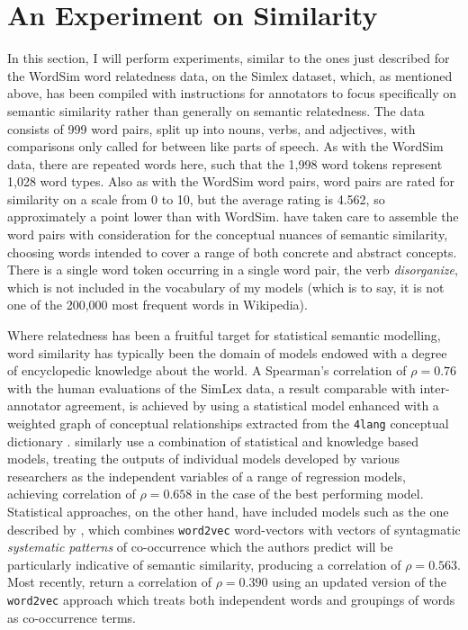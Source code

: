 \section{An Experiment on Similarity}
In this section, I will perform experiments, similar to the ones just described for the WordSim word relatedness data, on the Simlex dataset, which, as mentioned above, has been compiled with instructions for annotators to focus specifically on semantic similarity rather than generally on semantic relatedness.  The data consists of 999 word pairs, split up into nouns, verbs, and adjectives, with comparisons only called for between like parts of speech.  As with the WordSim data, there are repeated words here, such that the 1,998 word tokens represent 1,028 word types.  Also as with the WordSim word pairs, word pairs are rated for similarity on a scale from 0 to 10, but the average rating is 4.562, so approximately a point lower than with WordSim.  \cite{HillEA2015} have taken care to assemble the word pairs with consideration for the conceptual nuances of semantic similarity, choosing words intended to cover a range of both concrete and abstract concepts.  There is a single word token occurring in a single word pair, the verb \emph{disorganize}, which is not included in the vocabulary of my models (which is to say, it is not one of the 200,000 most frequent words in Wikipedia).

Where relatedness has been a fruitful target for statistical semantic modelling, word similarity has typically been the domain of models endowed with a degree of encyclopedic knowledge about the world.  A Spearman's correlation of $\rho = 0.76$ with the human evaluations of the SimLex data, a result comparable with inter-annotator agreement, is achieved by \cite{RecskiEA2016} using a statistical model enhanced with a weighted graph of conceptual relationships extracted from the \texttt{4lang} conceptual dictionary \citep{KornaiEA2015}.  \cite{BanjadeEA2015} similarly use a combination of statistical and knowledge based models, treating the outputs of individual models developed by various researchers as the independent variables of a range of regression models, achieving correlation of $\rho = 0.658$ in the case of the best performing model.  Statistical approaches, on the other hand, have included models such as the one described by \cite{SchwartzEA2015}, which combines \texttt{word2vec} word-vectors with vectors of syntagmatic \emph{systematic patterns} of co-occurrence which the authors predict will be particularly indicative of semantic similarity, producing a correlation of $\rho = 0.563$.  Most recently, \cite{MaEA2017} return a correlation of $\rho = 0.390$ using an updated version of the \texttt{word2vec} approach which treats both independent words and groupings of words as co-occurrence terms.

